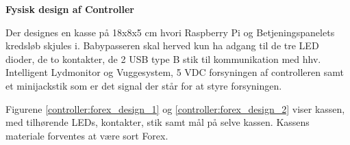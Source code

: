 
\textbf{Fysisk design af Controller}

Der designes en kasse på 18x8x5 cm hvori Raspberry Pi og Betjeningspanelets kredsløb skjules i. Babypasseren skal herved kun ha adgang til de tre LED dioder, de to kontakter, de 2 USB type B stik til kommunikation med hhv. Intelligent Lydmonitor og Vuggesystem, 5 VDC forsyningen af controlleren samt et minijackstik som er det signal der står for at styre forsyningen. 

Figurene \ref{controller:forex_design_1} og \ref{controller:forex_design_2} viser kassen, med tilhørende LEDs, kontakter, stik samt mål på selve kassen. Kassens materiale forventes at være sort Forex.  



